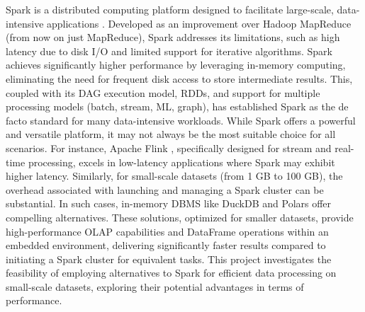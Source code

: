 \smallskip

Spark is a distributed computing platform designed to facilitate large-scale, data-intensive applications \cite{zaharia2010spark}. Developed as an improvement over Hadoop MapReduce (from now on just MapReduce), Spark addresses its limitations, such as high latency due to disk I/O and limited support for iterative algorithms. Spark achieves significantly higher performance by leveraging in-memory computing, eliminating the need for frequent disk access to store intermediate results. This, coupled with its DAG execution model, \glspl{RDD}, and support for multiple processing models (batch, stream, \gls{ML}, graph), has established Spark as the de facto standard for many data-intensive workloads.
While Spark offers a powerful and versatile platform, it may not always be the most suitable choice for all scenarios. For instance, Apache Flink \cite{carboneApacheFlinkStream}, specifically designed for stream and real-time processing, excels in low-latency applications where Spark may exhibit higher latency. Similarly, for small-scale datasets (from 1 GB to 100 GB), the overhead associated with launching and managing a Spark cluster can be substantial. In such cases, in-memory \gls{DBMS} like DuckDB \cite{raasveldtDuckDBEmbeddableAnalytical2019} and Polars \cite{vinkWroteOneFastest2021} offer compelling alternatives. These solutions, optimized for smaller datasets, provide high-performance \gls{OLAP} capabilities and DataFrame operations within an embedded environment, delivering significantly faster results compared to initiating a Spark cluster for equivalent tasks.
This project investigates the feasibility of employing alternatives to Spark for efficient data processing on small-scale datasets, exploring their potential advantages in terms of performance.

\smallskip

